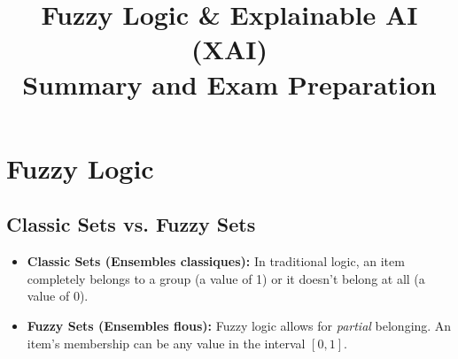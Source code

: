 \documentclass[11pt,a4paper]{article}
\title{\textbf{Fuzzy Logic \& Explainable AI (XAI)}\\ \Large Summary and Exam Preparation}
\author{}
\date{}
\begin{document}
\maketitle

\tableofcontents
\newpage

\section{Fuzzy Logic}

\subsection{Classic Sets vs. Fuzzy Sets}
\begin{itemize}
    \item \textbf{Classic Sets (Ensembles classiques):} In traditional logic, an item completely belongs to a group (a value of 1) or it doesn't belong at all (a value of 0).
    \item \textbf{Fuzzy Sets (Ensembles flous):} Fuzzy logic allows for \textit{partial} belonging. An item's membership can be any value in the interval $[0, 1]$.
\end{itemize}
\end{document}
